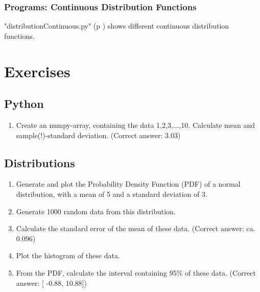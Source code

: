 \subsubsection{Programs: Continuous Distribution Functions}

\PyImg "distributionContinuous.py" (p \pageref{py:continuous}) shows different continuous distribution functions.

\section{Exercises}

\subsection*{Python}
\begin{enumerate}
  \item Create an numpy-array, containing the data 1,2,3,...,10. Calculate mean and sample(!)-standard deviation.
    (Correct answer: 3.03)
\end{enumerate}

\subsection*{Distributions}


\begin{enumerate}
  \item  Generate and plot the Probability Density Function (PDF) of a normal distribution, with a mean of 5 and a standard deviation of 3.
  \item  Generate 1000 random data from this distribution.
  \item  Calculate the standard error of the mean of these data.
    (Correct answer: ca. 0.096)

  \item  Plot the histogram of these data.
  \item  From the PDF, calculate the interval containing 95\% of these data.
    (Correct answer: [ -0.88, 10.88])
\end{enumerate}

